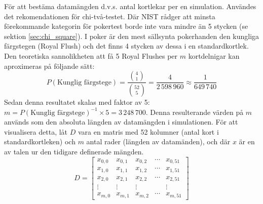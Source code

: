 \documentclass[swedish,a4paper]{article}
\begin{document}
För att bestäma datamängden d.v.s. antal kortlekar per en simulation. Användes
det rekomendationen för chi-två-testet. Där NIST rådger att minsta förekommande
kategorin för pokertest borde inte vara mindre än 5 stycken (se sektion
\ref{sec:chi_square}). 
I poker är den mest
sällsynta pokerhanden den kungliga färgstegen (Royal Flush) och det finns 4
stycken av dessa i en standardkortlek. Den teoretiska sannolikheten att
få 5 Royal Flushes per $m$ kortdelnigar kan aproximeras på följande sätt: 
$$ P(\text{Kunglig färgstege}) =  \frac{\binom{4}{1}}{\binom{52}{5}} =
\frac{4}{2\,598\,960} \approx \frac{1}{649\,740} $$ 
Sedan denna  resultatet skalas med faktor av 5:
$m = P(\text{Kunglig färgstege})^{-1}  \times 5 = 3\,248\,700$.
Denna resulterande värden på $m$ används som den absoluta längden av datamängden i
simulationen. För att visualisera detta, låt $D$ vara en \gls{matris} 
med 52 kolumner (antal kort i standardkortleken) och $m$ antal rader (längden av
datamänden), och där $x$ är en av talen ur den tidigare definerade mängden.
\begin{equation*}
	D = \begin{bmatrix}
		x_{0,0} & x_{0,1} & x_{0,2} & \cdots & x_{0,51}\\ 
		x_{1,0} & x_{1,1} & x_{1,2} & \cdots & x_{1,51}\\
		x_{2,0} & x_{2,1} & x_{2,2} & \cdots & x_{2,51}\\
		\vdots & \vdots & \vdots & \; & \vdots \\
		x_{m,0} & x_{m,1} & x_{m,2} & \cdots & x_{m,51}
	\end{bmatrix}
\end{equation*}
\end{document}

